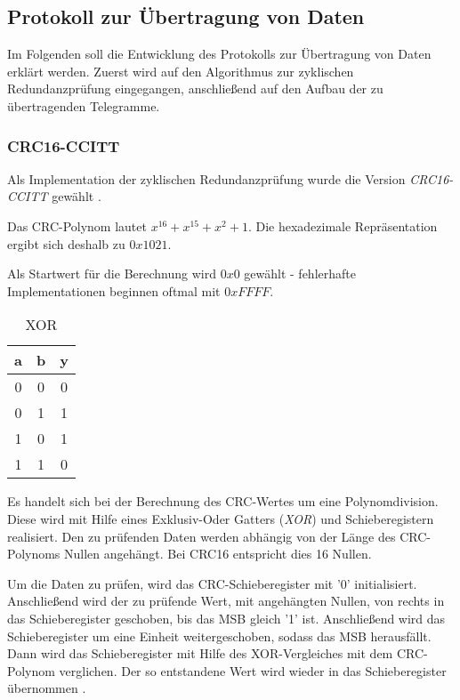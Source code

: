 
\subsection{Protokoll zur Übertragung von Daten}

Im Folgenden soll die Entwicklung des Protokolls zur Übertragung von Daten erklärt werden. Zuerst wird auf den Algorithmus zur zyklischen Redundanzprüfung eingegangen,
anschließend auf den Aufbau der zu übertragenden Telegramme.

\subsubsection{CRC16-CCITT}

Als Implementation der zyklischen Redundanzprüfung wurde die Version \textit{CRC16-CCITT} gewählt \citep{Sunshine}.

\smallskip

Das CRC-Polynom lautet $x^{16}+x^{15}+x^2+1$. Die hexadezimale Repräsentation ergibt sich deshalb zu $0x1021$.
\smallskip

Als Startwert für die Berechnung wird $0x0$ gewählt - fehlerhafte Implementationen beginnen oftmal mit $0xFFFF$. 

\begin{wraptable}{l}{30mm} 
    \centering
\begin{tabular}{ |c | c | c | }
    \hline
    a & b & y \\
    \hline \hline
    0 & 0 & 0 \\
    \hline
    0 & 1 & 1 \\
    \hline
    1 & 0 & 1 \\
    \hline
    1 & 1 & 0 \\
    \hline
\end{tabular}
\caption{XOR}
\end{wraptable}

\smallskip

Es handelt sich bei der Berechnung des CRC-Wertes um eine Polynomdivision. Diese wird mit Hilfe eines Exklusiv-Oder
Gatters (\textit{XOR}) und Schieberegistern realisiert. Den zu prüfenden Daten werden abhängig von der Länge des CRC-Polynoms Nullen angehängt.
Bei CRC16 entspricht dies 16 Nullen.


\smallskip

Um die Daten zu prüfen, wird das CRC-Schieberegister mit '0' initialisiert. Anschließend wird der zu prüfende Wert, mit angehängten Nullen, von rechts
in das Schieberegister geschoben, bis das \ac{MSB} gleich '1' ist. Anschließend wird das Schieberegister um eine Einheit weitergeschoben, sodass das \ac{MSB}
herausfällt. Dann wird das Schieberegister mit Hilfe des XOR-Vergleiches mit dem CRC-Polynom verglichen. Der so entstandene Wert wird wieder in das Schieberegister
übernommen \citep{IK_VL}. 

